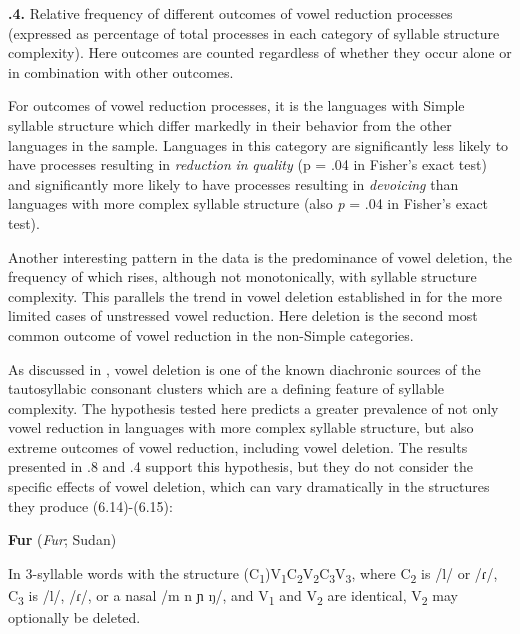 \textbf{.4.} Relative frequency of different outcomes of vowel reduction processes (expressed as percentage of total processes in each category of syllable structure complexity). Here outcomes are counted regardless of whether they occur alone or in combination with other outcomes.



  For outcomes of vowel reduction processes, it is the languages with Simple syllable structure which differ markedly in their behavior from the other languages in the sample. Languages in this category are significantly less likely to have processes resulting in \textit{reduction} \textit{in} \textit{quality} (p = .04 in Fisher’s exact test) and significantly more likely to have processes resulting in \textit{devoicing} than languages with more complex syllable structure (also \textit{p} = .04 in Fisher’s exact test).



  Another interesting pattern in the data is the predominance of vowel deletion, the frequency of which rises, although not monotonically, with syllable structure complexity. This parallels the trend in vowel deletion established in  for the more limited cases of unstressed vowel reduction. Here deletion is the second most common outcome of vowel reduction in the non-Simple categories. 



  As discussed in , vowel deletion is one of the known diachronic sources of the tautosyllabic consonant clusters which are a defining feature of syllable complexity. The hypothesis tested here predicts a greater prevalence of not only vowel reduction in languages with more complex syllable structure, but also extreme outcomes of vowel reduction, including vowel deletion. The results presented in .8 and .4 support this hypothesis, but they do not consider the specific effects of vowel deletion, which can vary dramatically in the structures they produce (6.14)-(6.15):



\ea\label{ex:(6.14)}
   \textbf{Fur} (\textit{Fur}; Sudan)



  In 3-syllable words with the structure (C\textsubscript{1})V\textsubscript{1}C\textsubscript{2}V\textsubscript{2}C\textsubscript{3}V\textsubscript{3}, where C\textsubscript{2} is /l/ or /ɾ/, C\textsubscript{3} is /l/, /ɾ/, or a nasal /m n ɲ ŋ/, and V\textsubscript{1} and V\textsubscript{2} are identical, V\textsubscript{2} may optionally be deleted.



